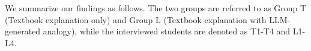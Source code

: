 We summarize our findings as follows. The two groups are referred to as Group T (Textbook explanation only) and Group L (Textbook explanation with LLM-generated analogy), while the interviewed students are denoted as T1-T4 and L1-L4.


